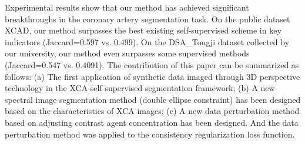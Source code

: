Experimental results show that our method has achieved significant breakthroughs in the coronary artery segmentation task. 
On the public dataset XCAD, our method surpasses the best existing self-supervised scheme in key indicators (Jaccard=0.597 vs. 0.499). 
On the DSA\_Tongji dataset collected by our university, our method even surpasses some supervised methods (Jaccard=0.547 vs. 0.4091). The contribution of this paper can be summarized as follows: (a) The first application of synthetic data imaged through 3D perspective technology in the XCA self supervised segmentation framework; (b) A new spectral image segmentation method (double ellipse constraint) has been designed based on the characteristics of XCA images; (c) A new data perturbation method based on adjusting contrast agent concentration has been designed. And the data perturbation method was applied to the consistency regularization loss function.


